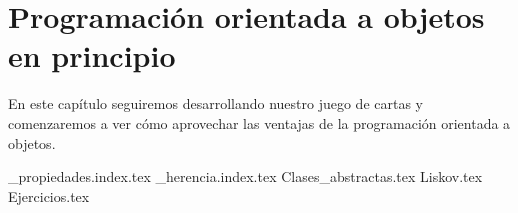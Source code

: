 \chapter{Programación orientada a objetos en principio}
  En este capítulo seguiremos desarrollando nuestro juego de cartas y comenzaremos a ver cómo
  aprovechar las ventajas de la programación orientada a objetos.

  {_propiedades.index.tex}
  {_herencia.index.tex}
  {Clases_abstractas.tex}
  {Liskov.tex}
  {Ejercicios.tex}
  \printbibliography[keyword=oop2]